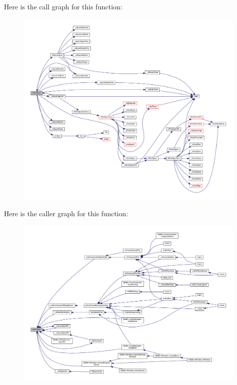 Here is the call graph for this function\+:
\nopagebreak
\begin{figure}[H]
\begin{center}
\leavevmode
\includegraphics[width=350pt]{sce-vfs_8c_a2966065604f0fcfa278b5246d4d653b9_cgraph}
\end{center}
\end{figure}
Here is the caller graph for this function\+:
\nopagebreak
\begin{figure}[H]
\begin{center}
\leavevmode
\includegraphics[width=350pt]{sce-vfs_8c_a2966065604f0fcfa278b5246d4d653b9_icgraph}
\end{center}
\end{figure}
\mbox{\label{sce-vfs_8c_ad40fac94880c0fb95185d3d03f43234b}} 
